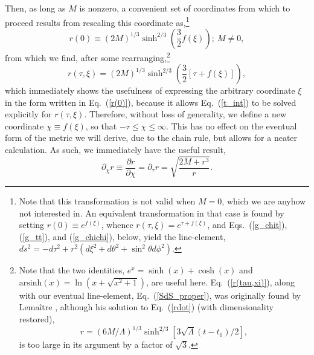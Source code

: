 Then, as long as $M$ is nonzero, a convenient set of coordinates from which to proceed results from rescaling this coordinate as,\footnote{Note that this transformation is not valid when $M=0$, which we are anyhow not interested in. An equivalent transformation in that case is found by setting $r(0)\equiv{e}^{f(\xi)}$, whence $r(\tau,\xi)=e^{\tau+f(\xi)}$, and Eqs.~(\ref{g_chit}), (\ref{g_tt}), and (\ref{g_chichi}), below, yield the line-element, $ds^2=-d\tau^2+r^2\left(d\xi^2+d\theta^2+\sin^2\theta{d\phi^2}\right)$.} 
\begin{equation}
r(0)\equiv(2M)^{1/3}\sinh^{2/3}\left(\frac{3}{2}f(\xi)\right) ;~M\neq0, \label{r(0)}
\end{equation}
from which we find, after some rearranging,\footnote{Note that the two identities, $e^x=\sinh(x)+\cosh(x)$ and $\mathrm{arsinh}(x)=\ln\left(x+\sqrt{x^2+1}\right)$, are useful here. Eq.~(\ref{r(tau,xi)}), along with our eventual line-element, Eq.~(\ref{SdS_proper}), was originally found by Lema\^{i}tre \cite{Lemaitre1949}, although his solution to Eq.~(\ref{rdot}) (with dimensionality restored),
\[r=(6M/\Lambda)^{1/3}\sinh^{2/3}\left[3\sqrt{\Lambda}(t-t_0)/2\right],\]
is too large in its argument by a factor of $\sqrt{3}$.}
\begin{equation}
r(\tau,\xi)=(2M)^{1/3}\sinh^{2/3}\left(\frac{3}{2}[\tau+f(\xi)]\right),\label{r(tau,xi)}
\end{equation}
which immediately shows the usefulness of expressing the arbitrary coordinate $\xi$ in the form written in Eq.~(\ref{r(0)}), because it allows Eq.~(\ref{t_int}) to be solved explicitly for $r(\tau,\xi)$. Therefore, without loss of generality, we define a new coordinate $\chi\equiv{f(\xi)}$, so that $-\tau\leq\chi\leq\infty$. This has no effect on the eventual form of the metric we will derive, due to the chain rule, but allows for a neater calculation. As such, we immediately have the useful result,
\begin{equation}
\partial_{\chi}r\equiv\frac{\partial{r}}{\partial\chi}=\partial_{\tau}r=\sqrt{\frac{2M+r^3}{r}}.\label{rprime}
\end{equation}

